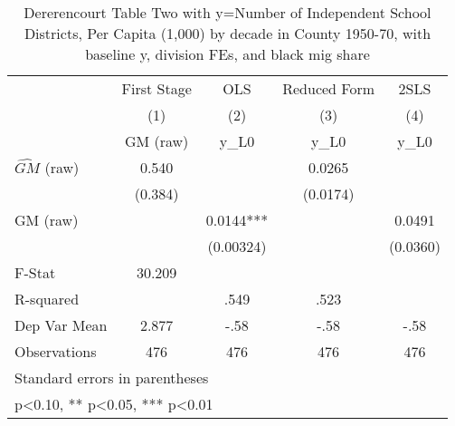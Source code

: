 \begin{table}[htbp]\centering
\def\sym#1{\ifmmode^{#1}\else\(^{#1}\)\fi}
\caption{Dererencourt Table Two with y=Number of Independent School Districts, Per Capita (1,000) by decade in County 1950-70, with baseline y, division FEs, and black mig share}
\begin{tabular}{l*{4}{c}}
\toprule
                    & First Stage   &         OLS   &Reduced Form   &        2SLS   \\
                    &\multicolumn{1}{c}{(1)}&\multicolumn{1}{c}{(2)}&\multicolumn{1}{c}{(3)}&\multicolumn{1}{c}{(4)}\\
                    &\multicolumn{1}{c}{GM  (raw)}&\multicolumn{1}{c}{y\_L0}&\multicolumn{1}{c}{y\_L0}&\multicolumn{1}{c}{y\_L0}\\
\midrule
$\hat{GM}$ (raw)    &       0.540   &               &      0.0265   &               \\
                    &     (0.384)   &               &    (0.0174)   &               \\
\addlinespace
GM  (raw)           &               &      0.0144***&               &      0.0491   \\
                    &               &   (0.00324)   &               &    (0.0360)   \\
\midrule
F-Stat              &      30.209   &               &               &               \\
R-squared           &               &        .549   &        .523   &               \\
Dep Var Mean        &       2.877   &        -.58   &        -.58   &        -.58   \\
Observations        &         476   &         476   &         476   &         476   \\
\bottomrule
\multicolumn{5}{l}{\footnotesize Standard errors in parentheses}\\
\multicolumn{5}{l}{\footnotesize * p<0.10, ** p<0.05, *** p<0.01}\\
\end{tabular}
\end{table}
